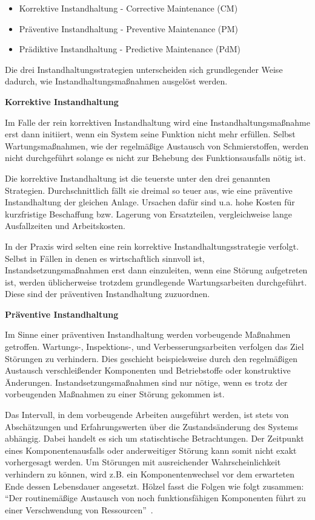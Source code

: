 \begin{itemize}
    \item Korrektive Instandhaltung - Corrective Maintenance (CM)
    \item Präventive Instandhaltung - Preventive Maintenance (PM)
    \item Prädiktive Instandhaltung - Predictive Maintenance (PdM)
\end{itemize}

Die drei Instandhaltungsstrategien unterscheiden sich grundlegender Weise dadurch, wie Instandhaltungsmaßnahmen ausgelöst werden.

\textbf{Korrektive Instandhaltung}

Im Falle der rein korrektiven Instandhaltung wird eine Instandhaltungsmaßnahme erst dann initiiert, wenn ein System seine Funktion nicht mehr erfüllen. Selbst Wartungsmaßnahmen, wie der regelmäßige Austausch von Schmierstoffen, werden nicht durchgeführt solange es nicht zur Behebung des Funktionsausfalls nötig ist.~\cite[S.~2]{Mobley.2002}

Die korrektive Instandhaltung ist die teuerste unter den drei genannten Strategien. Durchschnittlich fällt sie dreimal so teuer aus, wie eine präventive Instandhaltung der gleichen Anlage. Ursachen dafür sind u.a. hohe Kosten für kurzfristige Beschaffung bzw. Lagerung von Ersatzteilen, vergleichweise lange Ausfallzeiten und Arbeitskosten.~\cite[S.~3]{Mobley.2002}

In der Praxis wird selten eine rein korrektive Instandhaltungsstrategie verfolgt. Selbst in Fällen in denen es wirtschaftlich sinnvoll ist, Instandsetzungsmaßnahmen erst dann einzuleiten, wenn eine Störung aufgetreten ist, werden üblicherweise trotzdem grundlegende Wartungsarbeiten durchgeführt. Diese sind der präventiven Instandhaltung zuzuordnen.~\cite[S.~2]{Mobley.2002}

\textbf{Präventive Instandhaltung}

Im Sinne einer präventiven Instandhaltung werden vorbeugende Maßnahmen getroffen. Wartungs-, Inspektions-, und Verbesserungsarbeiten verfolgen das Ziel Störungen zu verhindern. Dies geschieht beispielsweise durch den regelmäßigen Austausch verschleißender Komponenten und Betriebstoffe oder konstruktive Änderungen. Instandsetzungsmaßnahmen sind nur nötige, wenn es trotz der vorbeugenden Maßnahmen zu einer Störung gekommen ist.

Das Intervall, in dem vorbeugende Arbeiten ausgeführt werden, ist stets von Abschätzungen und Erfahrungswerten über die Zustandsänderung des Systems abhängig. Dabei handelt es sich um statischtische Betrachtungen. Der Zeitpunkt eines Komponentenausfalls oder anderweitiger Störung kann somit nicht exakt vorhergesagt werden. Um Störungen mit ausreichender Wahrscheinlichkeit verhindern zu können, wird z.B. ein Komponentenwechsel vor dem erwarteten Ende dessen Lebensdauer angesetzt. Hölzel fasst die Folgen wie folgt zusammen: \enquote{Der routinemäßige Austausch von noch funktionsfähigen Komponenten führt zu einer Verschwendung von Ressourcen}~\cite[S.~29]{Holzel.2019}.

